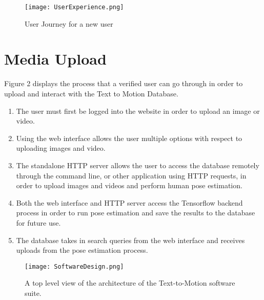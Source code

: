 \documentclass{scrreprt}
\begin{document}
\begin{figure}[!ht]
        \caption{User Journey for a new user}
        \label{erDiagram}
        \centering
        \texttt{[image: UserExperience.png]}
\end{figure}

\section{Media Upload}

Figure 2 displays the process that a verified user can go through in order to
upload and interact with the Text to Motion Database.

\begin{enumerate}
  \item The user must first be logged into the website in order to upload an
          image or video.
  \item Using the web interface allows the user multiple options with respect
          to uploading images and video.
  \item The standalone HTTP server allows the user to access the database
          remotely through the command line, or other application using HTTP
                requests, in order to upload images and videos and perform
                human pose estimation.
  \item Both the web interface and HTTP server access the Tensorflow backend
          process in order to run pose estimation and save the results to the
                database for future use.
  \item The database takes in search queries from the web interface and
          receives uploads from the pose estimation process.
\end{enumerate}


\begin{figure}[!ht]
        \caption{A top level view of the architecture of the Text-to-Motion
                 software suite.}
        \label{mediaUpload}
        \centering
        \texttt{[image: SoftwareDesign.png]}
\end{figure}
\end{document}
